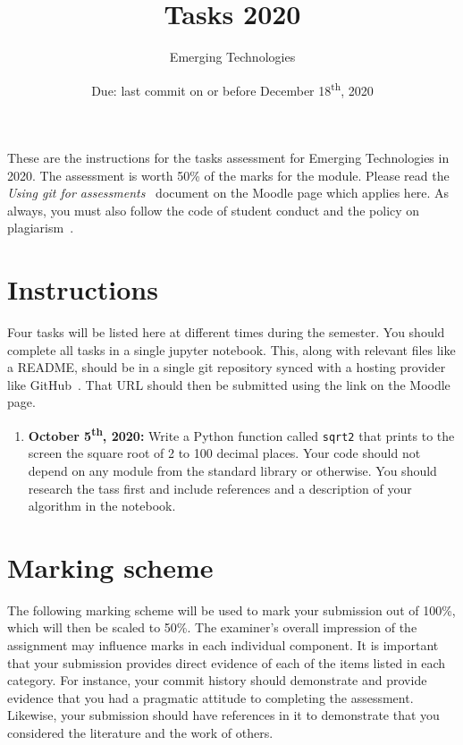 \documentclass[a4paper, 12pt]{scrartcl}
\title{\vspace{-20mm}Tasks 2020}
\author{Emerging Technologies}
\date{Due: last commit on or before December 18\textsuperscript{th}, 2020\vspace{-6mm}}
\begin{document}
  
  
  \maketitle

  These are the instructions for the tasks assessment for Emerging Technologies in 2020.
  The assessment is worth 50\% of the marks for the module.
  Please read the \emph{Using git for assessments}~\cite{usinggit} document on the Moodle page which applies here.
  As always, you must also follow the code of student conduct and the policy on plagiarism~\cite{gmitqaf}.

  \section*{Instructions}
  Four tasks will be listed here at different times during the semester.
  You should complete all tasks in a single jupyter notebook.
  This, along with relevant files like a README, should be in a single git repository synced with a hosting provider like GitHub~\cite{github}.
  That URL should then be submitted using the link on the Moodle page.

  \begin{enumerate}
    \item
      \textbf{October 5\textsuperscript{th}, 2020:}
      Write a Python function called \texttt{sqrt2} that prints to the screen the square root of 2 to 100 decimal places.
      Your code should not depend on any module from the standard library or otherwise.
      You should research the tass first and include references and a description of your algorithm in the notebook.
  \end{enumerate}


\newpage

\section*{Marking scheme}
  The following marking scheme will be used to mark your submission out of 100\%, which will then be scaled to 50\%.
  The examiner's overall impression of the assignment may influence marks in each individual component.
  It is important that your submission provides direct evidence of each of the items listed in each category.
  For instance, your commit history should demonstrate and provide evidence that you had a pragmatic attitude to completing the assessment.
  Likewise, your submission should have references in it to demonstrate that you considered the literature and the work of others.
\end{document}
